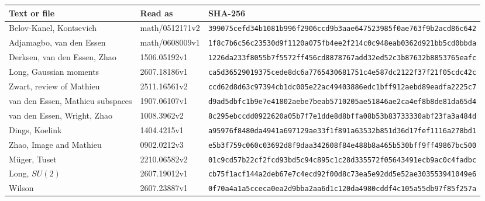\begin{table}[t]
\centering\scriptsize
\setlength{\tabcolsep}{3pt}
\begin{tabular}{@{}L{0.26\textwidth}L{0.16\textwidth}L{0.50\textwidth}@{}}
\toprule
Text or file & Read as & SHA-256 \\
\midrule
Belov-Kanel, Kontsevich & math/0512171v2 & \texttt{399075cefd34b108\allowbreak 1b996f2906ccd9b3\allowbreak aae647523985f0ae\allowbreak 763f9b2acd86c642} \\
Adjamagbo, van den Essen & math/0608009v1 & \texttt{1f8c7b6c56c23530\allowbreak d9f1120a075fb4ee\allowbreak 2f214c0c948eab03\allowbreak 62d921bb5cd0bbda} \\
Derksen, van den Essen, Zhao & 1506.05192v1 & \texttt{1226da233f8055b7\allowbreak f5572ff456cd8878\allowbreak 767add32ed52c3b8\allowbreak 7632b8853765eafc} \\
Long, Gaussian moments & 2607.18186v1 & \texttt{ca5d36529019375c\allowbreak ede8dc6a77654306\allowbreak 81751c4e587dc212\allowbreak 2f37f21f05cdc42c} \\
Zwart, review of Mathieu & 2511.16561v2 & \texttt{ccd62d8d63c97394\allowbreak cb1dc005e22ac494\allowbreak 03886edc1bff912a\allowbreak ebd89eadfa2225c7} \\
van den Essen, Mathieu subspaces & 1907.06107v1 & \texttt{d9ad5dbfc1b9e7e4\allowbreak 1802aebe7beab571\allowbreak 0205ae51846ae2ca\allowbreak 4ef8b8de81da65d4} \\
van den Essen, Wright, Zhao & 1008.3962v2 & \texttt{8c295ebccdd09226\allowbreak 20a05b7f7e1dde8d\allowbreak 8bffa08b53b83733\allowbreak 330abf23fa3a484d} \\
Dings, Koelink & 1404.4215v1 & \texttt{a95976f8480da494\allowbreak 1a697129ae33f1f8\allowbreak 91a63532b851d36d\allowbreak 17fef1116a278bd1} \\
Zhao, Image and Mathieu & 0902.0212v3 & \texttt{e5b3f759c060c036\allowbreak 92d8f9daa342608f\allowbreak 84e488b8a465b530\allowbreak bff9ff49867bc500} \\
M{\"u}ger, Tuset & 2210.06582v2 & \texttt{01c9cd57b22cf2fc\allowbreak d93bd5c94c895c1c\allowbreak 28d335572f056434\allowbreak 91ecb9ac0c4fadbc} \\
Long, $SU(2)$ & 2607.19012v1 & \texttt{cb75f1acf144a2de\allowbreak b67e7c4ecd92f00d\allowbreak 8c73ea5e92dd5e52\allowbreak ae303553941049e6} \\
Wilson & 2607.23887v1 & \texttt{0f70a4a1a5cceca0\allowbreak ea2d9bba2aa6d1c1\allowbreak 20da4980cddf4c10\allowbreak 5a55db97f85f257a} \\

\end{tabular}
\end{table}
